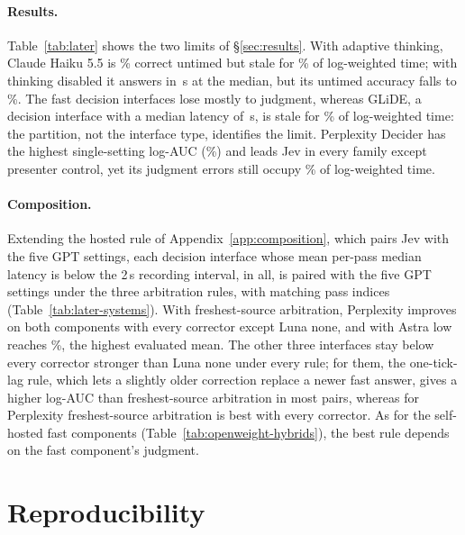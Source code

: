 \paragraph{Results.}
Table~\ref{tab:later} shows the two limits of \S\ref{sec:results}.
With adaptive thinking, Claude Haiku 5.5 is \LaterHaikuUntimed\% correct untimed but stale for \LaterHaikuStale\% of log-weighted time; with thinking disabled it answers in \LaterHaikuOffMedian\,s at the median, but its untimed accuracy falls to \LaterHaikuOffUntimed\%.
The fast decision interfaces lose mostly to judgment, whereas GLiDE, a decision interface with a median latency of \LaterGlideMedian\,s, is stale for \LaterGlideStale\% of log-weighted time: the partition, not the interface type, identifies the limit.
Perplexity Decider has the highest single-setting log-AUC (\LaterPerplexityAuc\%) and leads Jev in every family except presenter control, yet its judgment errors still occupy \LaterPerplexityJudgment\% of log-weighted time.

\paragraph{Composition.}
Extending the hosted rule of Appendix~\ref{app:composition}, which pairs Jev with the five GPT settings, each decision interface whose mean per-pass median latency is below the 2\,s recording interval, \LaterNumFastWord{} in all, is paired with the five GPT settings under the three arbitration rules, with matching pass indices (Table~\ref{tab:later-systems}).
With freshest-source arbitration, Perplexity improves on both components with every corrector except Luna none, and with Astra low reaches \LaterBestAuc\%, the highest evaluated mean.
The other three interfaces stay below every corrector stronger than Luna none under every rule; for them, the one-tick-lag rule, which lets a slightly older correction replace a newer fast answer, gives a higher log-AUC than freshest-source arbitration in most pairs, whereas for Perplexity freshest-source arbitration is best with every corrector.
As for the self-hosted fast components (Table~\ref{tab:openweight-hybrids}), the best rule depends on the fast component's judgment.

\FloatBarrier

\section{Reproducibility}
\label{app:repro}

